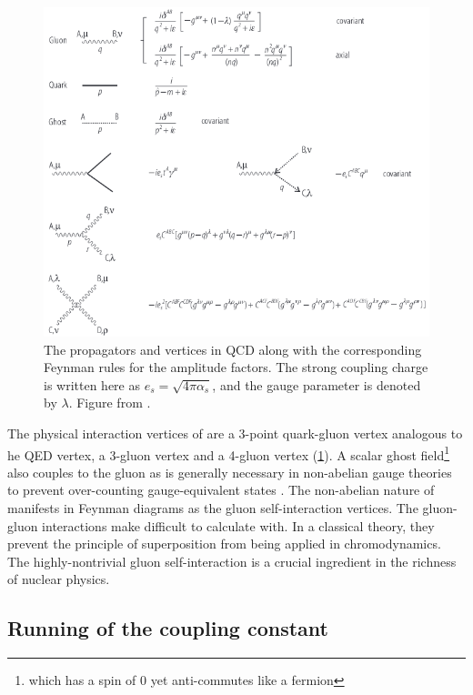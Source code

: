 \begin{figure}[t]
  \includegraphics{qcd_feynman.png}
  \caption{The propagators and vertices in QCD along with the corresponding Feynman rules for the amplitude factors. The strong coupling charge is written here as $e_s = \sqrt{4\pi\alpha_s}$, and the gauge parameter is denoted by $\lambda$. Figure from .}
  \label{fig:qcd_feynman}
\end{figure}

The physical interaction vertices of \qcd are a 3-point quark-gluon vertex analogous to he \ac{QED} vertex, a 3-gluon vertex and a 4-gluon vertex (\cref{fig:qcd_feynman}).
A scalar ghost field\footnote{which has a spin of 0 yet anti-commutes like a fermion} also couples to the gluon as is generally necessary in non-abelian gauge theories to prevent over-counting gauge-equivalent states \cite{Faddeev:1967fc}.
The non-abelian nature of \qcd manifests in Feynman diagrams as the gluon self-interaction vertices.
The gluon-gluon interactions make \qcd difficult to calculate with.
In a classical theory, they prevent the principle of superposition from being applied in chromodynamics.
The highly-nontrivial gluon self-interaction is a crucial ingredient in the richness of nuclear physics.


\subsection{Running of the coupling constant} %

